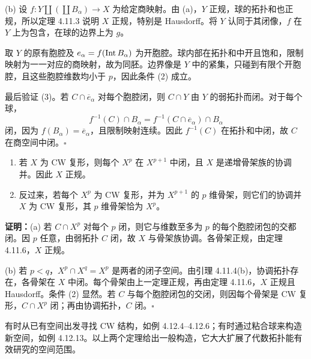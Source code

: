 (b) 设 $f:Y\amalg(\coprod B_\alpha)\to X$ 为给定商映射。由 (a)，$Y$ 正规，球的拓扑和也正规，所以定理 4.11.3 说明 $X$ 正规，特别是 Hausdorff。将 $Y$ 认同于其闭像，$f$ 在 $Y$ 上为包含，在球的边界上为 $g$。

取 $Y$ 的原有胞腔及 $e_\alpha=f(\operatorname{Int} B_\alpha)$ 为开胞腔。球内部在拓扑和中开且饱和，限制映射为一一对应的商映射，故为同胚。边界像是 $Y$ 中的紧集，只碰到有限个开胞腔，且这些胞腔维数均小于 $p$，因此条件 (2) 成立。

最后验证 (3)。若 $C\cap\overline e_\alpha$ 对每个胞腔闭，则 $C\cap Y$ 由 $Y$ 的弱拓扑而闭。对于每个球，
\[
f^{-1}(C)\cap B_\alpha=f^{-1}(C\cap\overline e_\alpha)\cap B_\alpha
\]
闭，因为 $f(B_\alpha)=\overline e_\alpha$，且限制映射连续。因此 $f^{-1}(C)$ 在拓扑和中闭，故 $C$ 在商空间中闭。\hfill$\square$

\begin{enumerate}[label=(\alph*)]
\item 若 $X$ 为 CW 复形，则每个 $X^p$ 在 $X^{p+1}$ 中闭，且 $X$ 是递增骨架族的协调并。因此 $X$ 正规。
\item 反过来，若每个 $X^p$ 为 CW 复形，并为 $X^{p+1}$ 的 $p$ 维骨架，则它们的协调并 $X$ 为 CW 复形，其 $p$ 维骨架恰为 $X^p$。
\end{enumerate}
\textbf{证明：}(a) 若 $C\cap X^p$ 对每个 $p$ 闭，则它与维数至多为 $p$ 的每个胞腔闭包的交都闭。因 $p$ 任意，由弱拓扑 $C$ 闭，故 $X$ 与骨架族协调。各骨架正规，由定理 4.11.6，$X$ 正规。

(b) 若 $p<q$，$X^p\cap X^q=X^p$ 是两者的闭子空间。由引理 4.11.4(b)，协调拓扑存在，各骨架在 $X$ 中闭。每个骨架由上一定理正规，再由定理 4.11.6，$X$ 正规且 Hausdorff。条件 (2) 显然。若 $C$ 与每个胞腔闭包的交闭，则因每个骨架是 CW 复形，$C\cap X^p$ 闭；再由协调拓扑，$C$ 闭。\hfill$\square$

有时从已有空间出发寻找 CW 结构，如例 4.12.4--4.12.6；有时通过粘合球来构造新空间，如例 4.12.13。以上两个定理给出一般构造，它大大扩展了代数拓扑能有效研究的空间范围。

